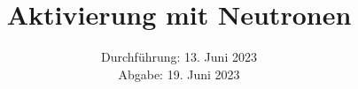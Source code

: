 

\subject{\texorpdfstring{\vspace{2ex}}{}V702\texorpdfstring{\vspace{-2ex}}{}} %
\title{Aktivierung mit Neutronen} %
\date{
	Durchführung: 13. Juni 2023 %
	\\ Abgabe: 19. Juni 2023 %
}




\maketitle
\thispagestyle{empty}


\tableofcontents
\newpage







\printbibliography{}

\newpage




